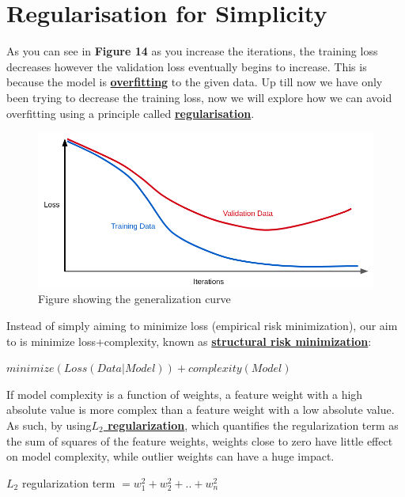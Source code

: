 \documentclass[12pt]{article}
\begin{document}
\section{Regularisation for Simplicity}
As you can see in \textbf{Figure 14} as you increase the iterations, the training loss decreases however the validation loss eventually begins to increase. This is because the model is \href{https://developers.google.com/machine-learning/crash-course/generalization/peril-of-overfitting}{\textbf{overfitting}} to the given data. Up till now we have only been trying to decrease the training loss, now we will explore how we can avoid overfitting using a principle called \href{https://developers.google.com/machine-learning/glossary#regularization}{\textbf{regularisation}}.
\begin{figure}[H]
	\includegraphics[scale = 0.5]{imgs/GeneralizationCurve.png}
	\centering
	\caption{Figure showing the generalization curve}
\end{figure}
Instead of simply aiming to minimize loss (empirical risk minimization), our aim to is minimize loss+complexity, known as \href{https://developers.google.com/machine-learning/glossary#SRM}{\textbf{structural risk minimization}}:
\begin{center}
$minimize(Loss(Data|Model)) + complexity(Model)$\\
\end{center}
If model complexity is a function of weights, a feature weight with a high absolute value is more complex than a feature weight with a low absolute value. As such, by using\href{https://developers.google.com/machine-learning/glossary#L2_regularization}{\textbf{$L_2$ regularization}}, which quantifies the regularization term as the sum of squares of the feature weights, weights close to zero have little effect on model complexity, while outlier weights can have a huge impact.
\begin{center}
$L_2$ regularization term $= w^2_1 + w^2_2 + .. + w^2_n$
\end{center}
\end{document}
